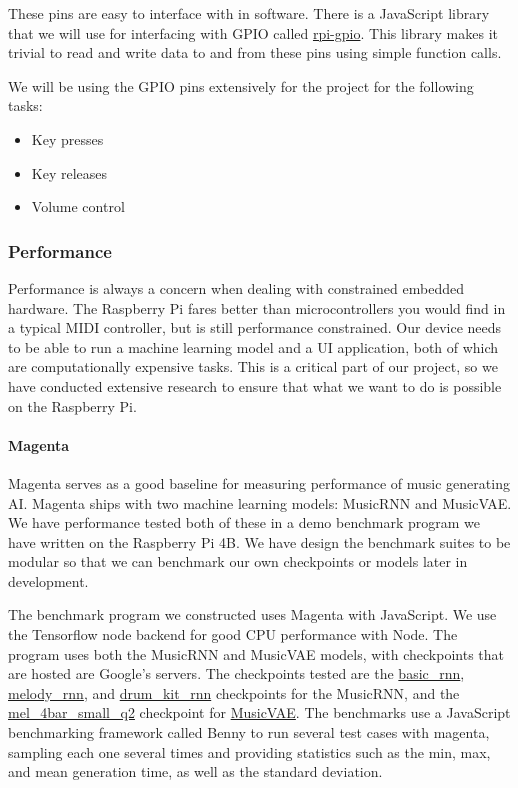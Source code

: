 These pins are easy to interface with in software. There is a JavaScript library
that we will use for interfacing with GPIO called \url{rpi-gpio}. This library makes it
trivial to read and write data to and from these pins using simple function calls.

We will be using the GPIO pins extensively for the project for the following tasks:

\begin{itemize}
  \item Key presses
  \item Key releases
  \item Volume control
\end{itemize}

\subsubsection{Performance}

Performance is always a concern when dealing with constrained embedded hardware. The
Raspberry Pi fares better than microcontrollers you would find in a typical MIDI
controller, but is still performance constrained. Our device needs to be able to run a
machine learning model and a UI application, both of which are computationally expensive
tasks. This is a critical part of our project, so we have conducted extensive research to
ensure that what we want to do is possible on the Raspberry Pi.

\paragraph{Magenta}

Magenta serves as a good baseline for measuring performance of music generating AI.
Magenta ships with two machine learning models: MusicRNN and MusicVAE. We have performance
tested both of these in a demo benchmark program we have written on the Raspberry Pi 4B.
We have design the benchmark suites to be modular so that we can benchmark our own
checkpoints or models later in development.

The benchmark program we constructed uses Magenta with JavaScript. We use the Tensorflow
node backend for good CPU performance with Node. The program uses both the MusicRNN and
MusicVAE models, with checkpoints that are hosted are Google's servers. The checkpoints
tested are the \url{basic_rnn}, \url{melody_rnn}, and \url{drum_kit_rnn} checkpoints for
the MusicRNN, and the \url{mel_4bar_small_q2} checkpoint for \url{MusicVAE}. The benchmarks
use a JavaScript benchmarking framework called Benny to run several test cases with
magenta, sampling each one several times and providing statistics such as the min, max,
and mean generation time, as well as the standard deviation.

